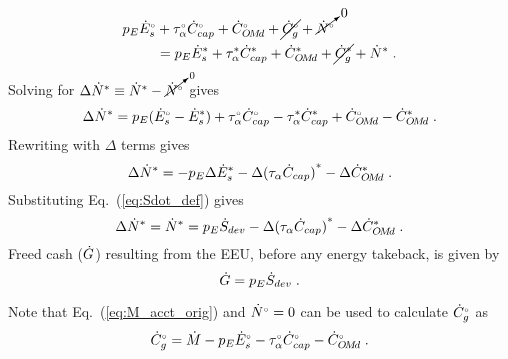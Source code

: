 \begin{landscape}
{\begin{align}
  p_E {}{\dot{E}}^{\scriptscriptstyle \circ}_s &+ {}{\tau}^{\scriptscriptstyle \circ}_\alpha {}{\dot{C}}^{\scriptscriptstyle \circ}_{cap} + {}{\dot{C}}^{\scriptscriptstyle \circ}_{O\!M\!d} + \cancel{{}{\dot{C}}^{\scriptscriptstyle \circ}_g} + \cancelto{0}{{}{\dot{N}}^{\scriptscriptstyle \circ}} \nonumber \\
                   &= p_E {\dot{E}}^*_s + {\tau}^*_\alpha {\dot{C}}^*_{cap} + {\dot{C}}^*_{O\!M\!d} + \cancel{{\dot{C}}^*_g}  + {\dot{N}}^* \; .
\end{align}
%
Solving for $\Delta {\dot{N}}^* \equiv {\dot{N}}^* - \cancelto{0}{{}{\dot{N}}^{\scriptscriptstyle \circ}}$ gives 
%
\begin{equation}
  \Delta {\dot{N}}^* = p_E({}{\dot{E}}^{\scriptscriptstyle \circ}_s - {\dot{E}}^*_s) 
                      + {}{\tau}^{\scriptscriptstyle \circ}_\alpha {}{\dot{C}}^{\scriptscriptstyle \circ}_{cap} - {\tau}^*_\alpha {\dot{C}}^*_{cap}
                      + {}{\dot{C}}^{\scriptscriptstyle \circ}_{O\!M\!d} - {\dot{C}}^*_{O\!M\!d} \; .
\end{equation}
%
Rewriting with $\Delta$ terms gives
%
\begin{equation}
  \Delta {\dot{N}}^* = - p_E \Delta {\dot{E}}^*_s - \Delta {(\tau_\alpha \dot{C}_{cap})}^* - \Delta {\dot{C}}^*_{O\!M\!d} \; .
\end{equation}
%
Substituting Eq.~(\ref{eq:Sdot_def}) gives
%
\begin{equation} \label{eq:N_dot_star_empl}
  \Delta {\dot{N}}^* = {\dot{N}}^* = p_E \dot{S}_{dev} - \Delta {(\tau_\alpha \dot{C}_{cap})}^* - \Delta {\dot{C}}^*_{O\!M\!d} \; .
\end{equation}
%
Freed cash ($\dot{G}$) resulting from the EEU, 
before any energy takeback, is given by 
%
\begin{equation} \label{eq:G_dot}
  \dot{G} = p_E \dot{S}_{dev} \; .
\end{equation}

Note that Eq.~(\ref{eq:M_acct_orig}) and ${}{\dot{N}}^{\scriptscriptstyle \circ} = 0$ can be used to calculate ${}{\dot{C}}^{\scriptscriptstyle \circ}_g$ as
%
\begin{equation} \label{eq:C_dot_o}
  {}{\dot{C}}^{\scriptscriptstyle \circ}_g = \dot{M} - p_E {}{\dot{E}}^{\scriptscriptstyle \circ}_s - {}{\tau}^{\scriptscriptstyle \circ}_\alpha {}{\dot{C}}^{\scriptscriptstyle \circ}_{cap} - {}{\dot{C}}^{\scriptscriptstyle \circ}_{O\!M\!d} \; .
\end{equation}
%

}
\end{landscape}

\restoregeometry

